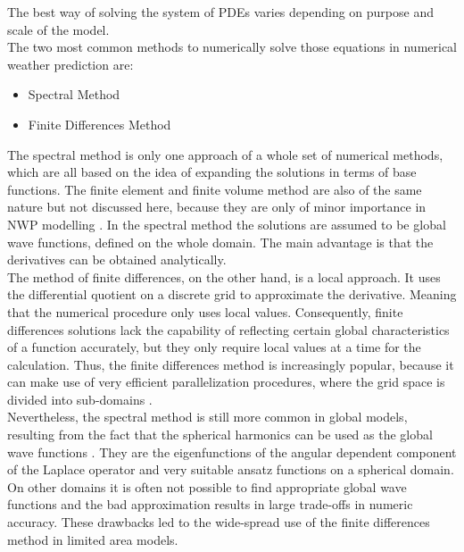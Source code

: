 The best way of solving the system of PDEs varies depending on purpose and scale of the model.\\
The two most common methods to numerically solve those equations in numerical weather prediction are:
\begin{itemize}
    \item{Spectral Method}
    \item{Finite Differences Method}
\end{itemize}
The spectral method is only one approach of a whole set of numerical methods, which are all based on the idea of expanding the solutions in terms of base functions. The finite element and finite volume method are also of the same nature but not discussed here, because they are only of minor importance in NWP modelling \cite{batkai2016mathematical}.
In the spectral method the solutions are assumed to be global wave functions, defined on the whole domain. The main advantage is that the derivatives can be obtained analytically.\\
The method of finite differences, on the other hand, is a local approach. It uses the differential quotient on a discrete grid to approximate the derivative. Meaning that the numerical procedure only uses local values. Consequently, finite differences solutions lack the capability of reflecting certain global characteristics of a function accurately, but they only require local values at a time for the calculation. Thus, the finite differences method is increasingly popular, because it can make use of very efficient parallelization procedures, where the grid space is divided into sub-domains \cite{batkai2016mathematical}.\\ 
Nevertheless, the spectral method is still more common in global models, resulting from the fact that the spherical harmonics can be used as the global wave functions \cite{batkai2016mathematical, coiffier2011fundamentals}. They are the eigenfunctions of the angular dependent component of the Laplace operator and very suitable ansatz functions on a spherical domain. On other domains it is often not possible to find appropriate global wave functions and the bad approximation results in large trade-offs in numeric accuracy. These drawbacks led to the wide-spread use of the finite differences method in limited area models. \\

